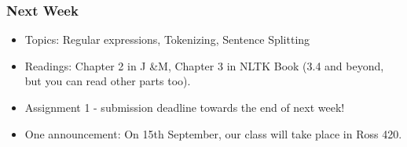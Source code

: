 \documentclass{beamer}
\begin{document}
\begin{frame}
\frametitle{Next Week}
\begin{itemize}
\item Topics: Regular expressions, Tokenizing, Sentence Splitting
\item Readings: Chapter 2 in J \&M, Chapter 3 in NLTK Book (3.4 and beyond, but you can read other parts too).
\item Assignment 1 - submission deadline towards the end of next week! 
\item One announcement: On 15th September, our class will take place in Ross 420. 
\end{itemize}
\end{frame}
\end{document}
